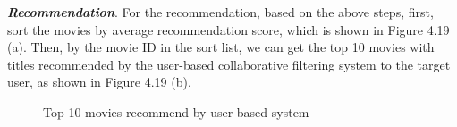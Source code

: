 \textbf{\textit{Recommendation}}. For the recommendation, based on the above steps, first, sort the movies by average recommendation score, which is shown in Figure 4.19 (a). Then, by the movie ID in the sort list, we can get the top 10 movies with titles recommended by the user-based collaborative filtering system to the target user, as shown in Figure 4.19 (b).

 \begin{figure}[htbp]
\centering
{}%
%
\centering
\caption{Top 10 movies recommend by user-based system }
\end{figure}